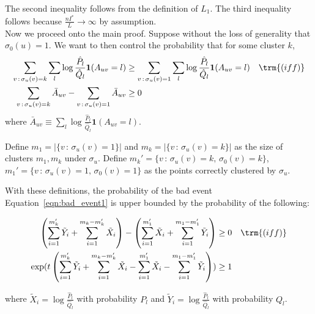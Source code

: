 \documentclass{article}
\begin{document}
The second inequality follows from the definition of $L_1$. The third inequality follows because $\frac{n I^*}{L} \rightarrow \infty$ by assumption. \\


Now we proceed onto the main proof. Suppose without the loss of generality that $\sigma_0(u) = 1$.  We want to then control the probability that for some cluster $k$, 
\begin{align}
\sum_{v\,:\, \sigma_u(v)=k} \sum_l \log \frac{\hat{P}_l}{\hat{Q}_l} \mathbf{1}(A_{uv} = l) 
&\geq 
 \sum_{v\,:\, \sigma_u(v)=1} \sum_l \log \frac{\hat{P}_l}{\hat{Q}_l} \mathbf{1}(A_{uv} = l) 
  \quad \trm{(iff)}  \nonumber \\
\sum_{v \,:\, \sigma_u(v) = k} \bar{A}_{uv} - \sum_{v\,:\, \sigma_u(v) = 1} \bar{A}_{uv} 
\label{eqn:bad_event1}
&\geq 0 
\end{align}
where $\bar{A}_{uv} \equiv \sum_l \log \frac{\hat{P}_l}{\hat{Q}_l} \mathbf{1}(A_{uv} = l)$.

Define $m_1 = |\{ v \,:\, \sigma_u(v) = 1 \}|$ and $m_k = | \{ v \,:\, \sigma_u(v) = k \}|$ as the size of clusters $m_1, m_k$ under $\sigma_u$. Define $m_k' = \{ v \,:\, \sigma_u(v) = k,\, \sigma_0(v) = k \}$, $m_1' = \{ v \,:\, \sigma_u(v) = 1 ,\, \sigma_0(v) = 1\}$ as the points correctly clustered by $\sigma_u$. 

With these definitions, the probability of the bad event Equation~\ref{eqn:bad_event1} is upper bounded by the probability of the following:

\begin{align*}
\left( \sum_{i=1}^{m_k'} \tilde{Y}_i + \sum_{i=1}^{m_k - m'_k} \tilde{X}_i \right) - 
\left( \sum_{i=1}^{m_1'} \tilde{X}_i + \sum_{i=1}^{m_1 - m_1'} \tilde{Y}_i  \right) &\geq 0  \quad \trm{(iff)} \\
\exp( t \left( \sum_{i=1}^{m_k'} \tilde{Y}_i + \sum_{i=1}^{m_k - m_k'} \tilde{X}_i - 
     \sum_{i=1}^{m_1'}  \tilde{X}_i - \sum_{i=1}^{m_1 - m_1'} \tilde{Y}_i  \right) ) &\geq 1 
\end{align*}

 where $\tilde{X}_i = \log \frac{\hat{P}_l}{\hat{Q}_l}$ with probability $P_l$ and $\tilde{Y}_i = \log \frac{\hat{P}_l}{\hat{Q}_l}$ with probability $Q_l$. 
\end{document}
